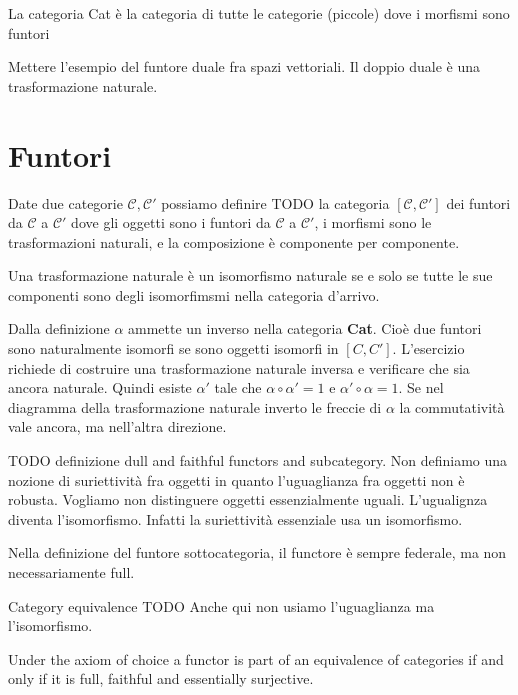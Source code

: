 \documentclass[a4paper]{article}
\begin{document}
La categoria Cat è la categoria di tutte le categorie (piccole)
dove i morfismi sono funtori

Mettere l'esempio del funtore duale fra spazi vettoriali.
Il doppio duale è una trasformazione naturale.

\section{Funtori}

Date due categorie \(\mathcal{C},\mathcal{C}'\)
possiamo definire TODO
la categoria \([\mathcal{C}, \mathcal{C}']\)
dei funtori da \(\mathcal{C}\) a \(\mathcal{C}'\)
dove gli oggetti sono i funtori da \(\mathcal{C}\) a \(\mathcal{C}'\),
i morfismi sono le trasformazioni naturali, e la composizione è componente per componente.

\begin{snippetexercise}{}
    Una trasformazione naturale
    è un isomorfismo naturale se e solo se
    tutte le sue componenti sono degli isomorfimsmi nella categoria d'arrivo.

    Dalla definizione \(\alpha\) ammette un inverso nella categoria \textbf{Cat}.
    Cioè due funtori sono naturalmente isomorfi se sono oggetti isomorfi in \([C, C']\).
    L'esercizio richiede di costruire una trasformazione naturale inversa e verificare che sia ancora naturale.
    Quindi esiste \(\alpha'\) tale che \(\alpha \circ \alpha' = 1\) e \(\alpha' \circ \alpha = 1\).
    Se nel diagramma della trasformazione naturale inverto le freccie di \(\alpha\)
    la commutatività vale ancora, ma nell'altra direzione.
\end{snippetexercise}

TODO definizione dull and faithful functors and subcategory.
Non definiamo una nozione di suriettività fra oggetti in quanto l'uguaglianza fra oggetti non è robusta.
Vogliamo non distinguere oggetti essenzialmente uguali. L'ugualignza diventa l'isomorfismo.
Infatti la suriettività essenziale usa un isomorfismo.

Nella definizione del funtore sottocategoria, il functore è sempre federale, ma non necessariamente full.

\begin{snippetdefinition}{Category equivalence}
    TODO
    Anche qui non usiamo l'uguaglianza ma l'isomorfismo.
\end{snippetdefinition}

\begin{snippettheorem}{}
    Under the axiom of choice a functor is part of an equivalence of categories if and only if
    it is full, faithful and essentially surjective.
\end{snippettheorem}
\end{document}
